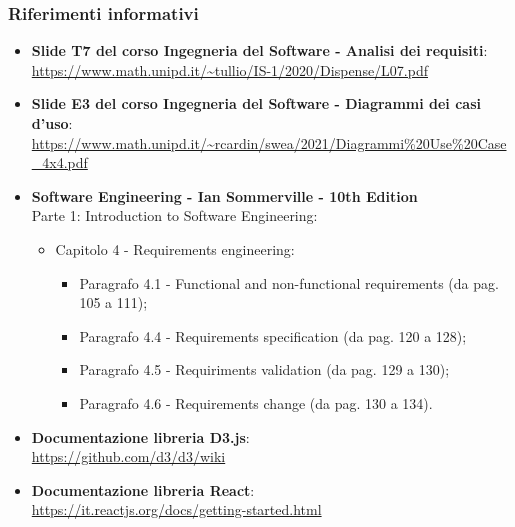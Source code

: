 \subsubsection{Riferimenti informativi}
\begin{itemize}
	\item \textbf{Slide T7 del corso Ingegneria del Software - Analisi dei requisiti}:\\
	\textcolor{blue}{\url{https://www.math.unipd.it/~tullio/IS-1/2020/Dispense/L07.pdf}}
	\item \textbf{Slide E3 del corso Ingegneria del Software - Diagrammi dei casi d'uso}:\\
	\textcolor{blue}{\url{https://www.math.unipd.it/~rcardin/swea/2021/Diagrammi\%20Use\%20Case_4x4.pdf}}

\item \textbf{Software Engineering - Ian Sommerville - 10th Edition}\\ Parte 1: Introduction to Software Engineering:
	\begin{itemize}
	\item Capitolo 4 - Requirements engineering:
		\begin{itemize}
			\item Paragrafo 4.1 - Functional and non-functional requirements (da pag. 105 a 111);
			\item Paragrafo 4.4 - Requirements specification (da pag. 120 a 128);
			\item Paragrafo 4.5 - Requiriments validation (da pag. 129 a 130);
			\item Paragrafo 4.6 - Requirements change (da pag. 130 a 134).
		\end{itemize}
	\end{itemize}
	\item \textbf{Documentazione libreria D3.js}: \\
	\textcolor{blue}{\url{https://github.com/d3/d3/wiki}}
	
	\item \textbf{Documentazione libreria React}: \\
	\textcolor{blue}{\url{https://it.reactjs.org/docs/getting-started.html}}
	

\end{itemize}
	
	

